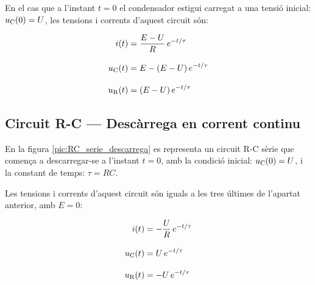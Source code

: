\vspace{5mm}
En el cas que a l'instant $t=0$ el condensador  estigui carregat a una tensió inicial: $u_\mathrm{C}(0) = U$, les tensions i corrents d'aquest circuit són:

\hfill
\begin{minipage}[b]{9cm}
    
\end{minipage}
\hfill
\begin{minipage}[b]{6cm}
    \begin{align}
        i(t) &= \frac{E-U}{R}\,e^{-t/\tau} \\[3mm]
        u_\mathrm{C}(t) &= E  - (E-U) \,e^{-t/\tau}  \\[3mm]
        u_\mathrm{R}(t) &= (E-U)\,e^{-t/\tau}
    \end{align}
\end{minipage}


\subsection{Circuit R-C --- Descàrrega en corrent continu}\label{sec:RC-descarrega}

En la figura \vref{pic:RC_serie_descarrega} es representa un circuit R-C sèrie que comença a descarregar-se a l'instant $t=0$, amb la condició inicial: $u_\mathrm{C}(0) = U$, i la constant de temps: $\tau = R C$.
\begin{center}
    
    \label{pic:RC_serie_descarrega}
\end{center}

Les tensions i corrents d'aquest circuit són iguals a les tres últimes de l'apartat anterior, amb $E=0$:

\hfill
\begin{minipage}[b]{9cm}
    
\end{minipage}
\hfill
\begin{minipage}[b]{6cm}
    \begin{align}
        i(t) &= - \frac{U}{R}\,e^{-t/\tau} \\[3mm]
        u_\mathrm{C}(t) &= U\,e^{-t/\tau} \\[3mm]
        u_\mathrm{R}(t) &= - U\,e^{-t/\tau}
    \end{align}
\end{minipage}


